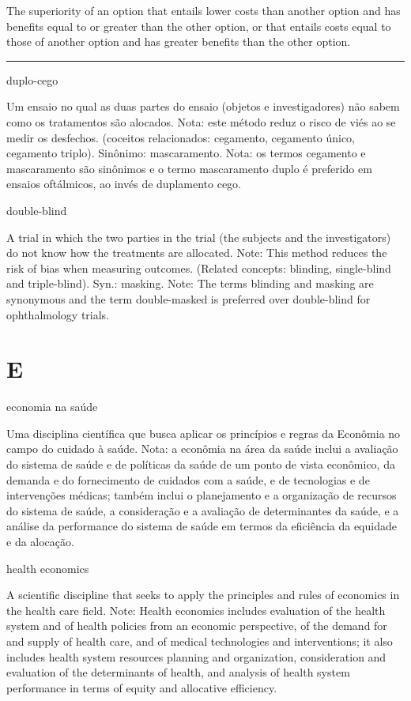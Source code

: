 \documentclass[
  openany]{book}
\begin{document}
The superiority of an option that entails lower costs than another option and has benefits equal to or greater than the other option, or that entails costs equal to those of another option and has greater benefits than the other option.

\begin{center}\rule{0.5\linewidth}{0.5pt}\end{center}

duplo-cego

Um ensaio no qual as duas partes do ensaio (objetos e investigadores) não sabem como os tratamentos são alocados. Nota: este método reduz o risco de viés ao se medir os desfechos. (coceitos relacionados: cegamento, cegamento único, cegamento triplo). Sinônimo: mascaramento. Nota: os termos cegamento e mascaramento são sinônimos e o termo mascaramento duplo é preferido em ensaios oftálmicos, ao invés de duplamento cego.

double-blind

A trial in which the two parties in the trial (the subjects and the investigators) do not know how the treatments are allocated. Note: This method reduces the risk of bias when measuring outcomes. (Related concepts: blinding, single-blind and triple-blind). Syn.: masking. Note: The terms blinding and masking are synonymous and the term double-masked is preferred over double-blind for ophthalmology trials.

\hypertarget{e}{%
\chapter*{E}\label{e}}

economia na saúde

Uma disciplina científica que busca aplicar os princípios e regras da Econômia no campo do cuidado à saúde. Nota: a econômia na área da saúde inclui a avaliação do sistema de saúde e de políticas da saúde de um ponto de vista econômico, da demanda e do fornecimento de cuidados com a saúde, e de tecnologias e de intervenções médicas; também inclui o planejamento e a organização de recursos do sistema de saúde, a consideração e a avaliação de determinantes da saúde, e a análise da performance do sistema de saúde em termos da eficiência da equidade e da alocação.

health economics

A scientific discipline that seeks to apply the principles and rules of economics in the health care field. Note: Health economics includes evaluation of the health system and of health policies from an economic perspective, of the demand for and supply of health care, and of medical technologies and interventions; it also includes health system resources planning and organization, consideration and evaluation of the determinants of health, and analysis of health system performance in terms of equity and allocative efficiency.
\end{document}
